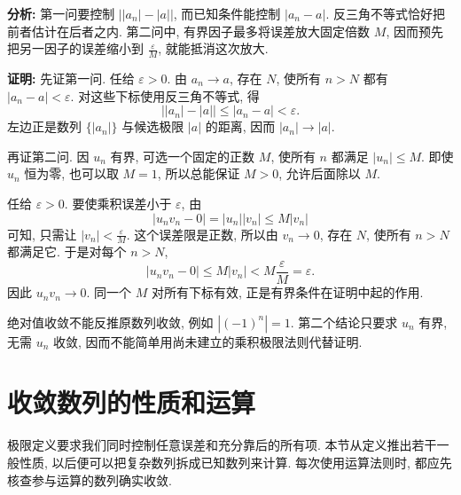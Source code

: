 \documentclass[UTF8,openany]{ctexbook}
\theoremstyle{chinesetextbook}
\newenvironment{cnproof}{\par\indent\textbf{证明:} \ignorespaces}{\par}
\begin{document}
\par\indent\textbf{分析:} 第一问要控制 $\bigl||a_n|-|a|\bigr|$, 而已知条件能控制 $|a_n-a|$. 反三角不等式恰好把前者估计在后者之内. 第二问中, 有界因子最多将误差放大固定倍数 $M$, 因而预先把另一因子的误差缩小到 $\displaystyle\frac\varepsilon M$, 就能抵消这次放大.
\begin{cnproof}
先证第一问. 任给 $\varepsilon>0$. 由 $a_n\to a$, 存在 $N$, 使所有 $n>N$ 都有 $|a_n-a|<\varepsilon$. 对这些下标使用反三角不等式, 得
\[
\bigl||a_n|-|a|\bigr|\le|a_n-a|<\varepsilon.
\]
左边正是数列 $\{|a_n|\}$ 与候选极限 $|a|$ 的距离, 因而 $|a_n|\to|a|$.

再证第二问. 因 $u_n$ 有界, 可选一个固定的正数 $M$, 使所有 $n$ 都满足 $|u_n|\le M$. 即使 $u_n$ 恒为零, 也可以取 $M=1$, 所以总能保证 $M>0$, 允许后面除以 $M$.

任给 $\varepsilon>0$. 要使乘积误差小于 $\varepsilon$, 由
\[
|u_nv_n-0|=|u_n||v_n|\le M|v_n|
\]
可知, 只需让 $\displaystyle |v_n|<\frac\varepsilon M$. 这个误差限是正数, 所以由 $v_n\to0$, 存在 $N$, 使所有 $n>N$ 都满足它. 于是对每个 $n>N$,
\[
|u_nv_n-0|\le M|v_n|<M\frac\varepsilon M=\varepsilon.
\]
因此 $u_nv_n\to0$. 同一个 $M$ 对所有下标有效, 正是有界条件在证明中起的作用.
\end{cnproof}
绝对值收敛不能反推原数列收敛, 例如 $|(-1)^n|=1$. 第二个结论只要求 $u_n$ 有界, 无需 $u_n$ 收敛, 因而不能简单用尚未建立的乘积极限法则代替证明.
\section{收敛数列的性质和运算}
极限定义要求我们同时控制任意误差和充分靠后的所有项. 本节从定义推出若干一般性质, 以后便可以把复杂数列拆成已知数列来计算. 每次使用运算法则时, 都应先核查参与运算的数列确实收敛.
\end{document}
